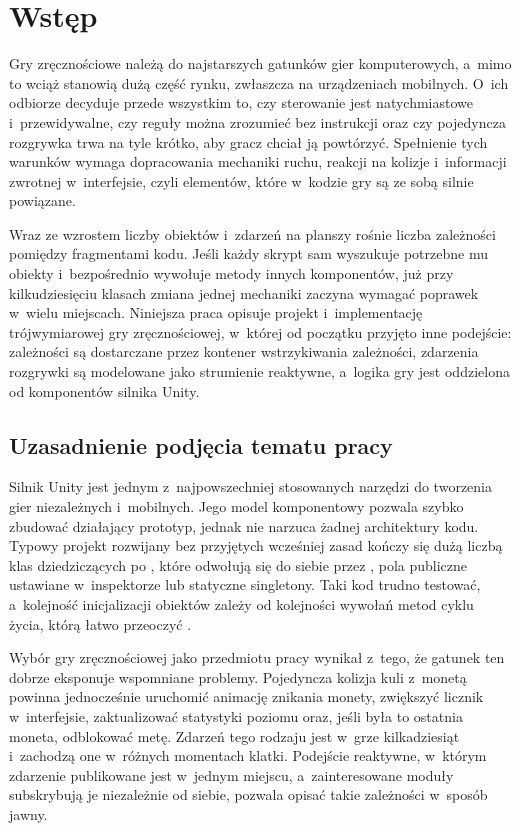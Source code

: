 \chapter{Wstęp}

Gry zręcznościowe należą do najstarszych gatunków gier komputerowych, a~mimo to wciąż
stanowią dużą część rynku, zwłaszcza na urządzeniach mobilnych. O~ich odbiorze decyduje
przede wszystkim to, czy sterowanie jest natychmiastowe i~przewidywalne, czy reguły można
zrozumieć bez instrukcji oraz czy pojedyncza rozgrywka trwa na tyle krótko, aby gracz chciał
ją powtórzyć. Spełnienie tych warunków wymaga dopracowania mechaniki ruchu, reakcji na
kolizje i~informacji zwrotnej w~interfejsie, czyli elementów, które w~kodzie gry są ze sobą
silnie powiązane.

Wraz ze wzrostem liczby obiektów i~zdarzeń na planszy rośnie liczba zależności pomiędzy
fragmentami kodu. Jeśli każdy skrypt sam wyszukuje potrzebne mu obiekty i~bezpośrednio
wywołuje metody innych komponentów, już przy kilkudziesięciu klasach zmiana jednej
mechaniki zaczyna wymagać poprawek w~wielu miejscach. Niniejsza praca opisuje projekt
i~implementację trójwymiarowej gry zręcznościowej, w~której od początku przyjęto inne podejście:
zależności są dostarczane przez kontener wstrzykiwania zależności, zdarzenia rozgrywki są
modelowane jako strumienie reaktywne, a~logika gry jest oddzielona od komponentów silnika
Unity.

\section{Uzasadnienie podjęcia tematu pracy}

Silnik Unity jest jednym z~najpowszechniej stosowanych narzędzi do tworzenia gier
niezależnych i~mobilnych. Jego model komponentowy pozwala szybko zbudować działający
prototyp, jednak nie narzuca żadnej architektury kodu. Typowy projekt rozwijany bez
przyjętych wcześniej zasad kończy się dużą liczbą klas dziedziczących po
, które odwołują się do siebie przez , pola
publiczne ustawiane w~inspektorze lub statyczne singletony. Taki kod trudno testować,
a~kolejność inicjalizacji obiektów zależy od kolejności wywołań metod cyklu życia, którą
łatwo przeoczyć \cite{unity-order}.

Wybór gry zręcznościowej jako przedmiotu pracy wynikał z~tego, że gatunek ten dobrze
eksponuje wspomniane problemy. Pojedyncza kolizja kuli z~monetą powinna jednocześnie
uruchomić animację znikania monety, zwiększyć licznik w~interfejsie, zaktualizować statystyki
poziomu oraz, jeśli była to ostatnia moneta, odblokować metę. Zdarzeń tego rodzaju jest
w~grze kilkadziesiąt i~zachodzą one w~różnych momentach klatki. Podejście reaktywne,
w~którym zdarzenie publikowane jest w~jednym miejscu, a~zainteresowane moduły
subskrybują je niezależnie od siebie, pozwala opisać takie zależności w~sposób jawny.

